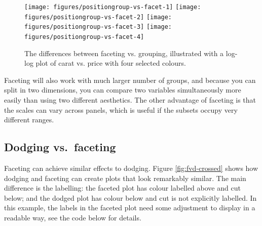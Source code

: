 \begin{figure}

{\centering \texttt{[image: figures/positiongroup-vs-facet-1]} \texttt{[image: figures/positiongroup-vs-facet-2]} \texttt{[image: figures/positiongroup-vs-facet-3]} \texttt{[image: figures/positiongroup-vs-facet-4]} 

}

\caption{The differences between faceting vs. grouping, illustrated with a log-log plot of carat vs. price with four selected colours.\label{fig:group-vs-facet}}
\end{figure}

Faceting will also work with much larger number of groups, and because
you can split in two dimensions, you can compare two variables
simultaneously more easily than using two different aesthetics. The
other advantage of faceting is that the scales can vary across panels,
which is useful if the subsets occupy very different ranges.

\subsection{Dodging vs.~faceting}\label{sub:dodge-vs-facet}

Faceting can achieve similar effects to dodging. Figure
\ref{fig:fvd-crossed} shows how dodging and faceting can create plots
that look remarkably similar. The main difference is the labelling: the
faceted plot has colour labelled above and cut below; and the dodged
plot has colour below and cut is not explicitly labelled. In this
example, the labels in the faceted plot need some adjustment to display
in a readable way, see the code below for details.
 

\begin{Shaded}
\begin{Highlighting}[]
  \NormalTok{, } 
   \NormalTok{)}
  \NormalTok{, } \StringTok{ }
\StringTok{  }\StringTok{ }\StringTok{ }
\StringTok{  }\NormalTok{(} \NormalTok{(} \NormalTok{, } \NormalTok{, } \NormalTok{, }
    \NormalTok{))}
\end{Highlighting}
\end{Shaded}

